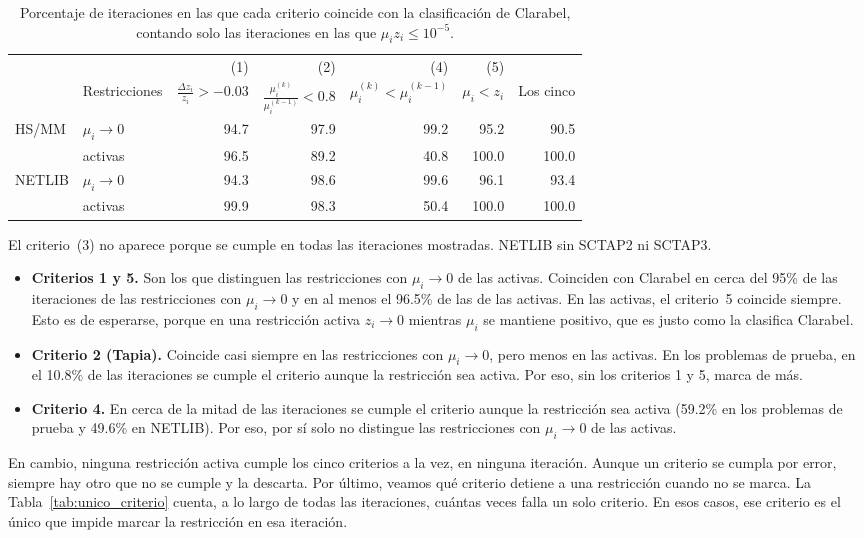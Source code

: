 \begin{table}[H]
\centering
\caption{Porcentaje de iteraciones en las que cada criterio coincide con la clasificación de Clarabel, contando solo las iteraciones en las que $\mu_i z_i \le 10^{-5}$.}
\label{tab:si_por_criterio}
\small
\begin{tabular}{l l r r r r r}
\toprule
 & & (1) & (2) & (4) & (5) & \\
 & Restricciones & $\frac{\Delta z_i}{z_i} > -0.03$ & $\frac{\mu_i^{(k)}}{\mu_i^{(k-1)}} < 0.8$ & $\mu_i^{(k)} < \mu_i^{(k-1)}$ & $\mu_i < z_i$ & Los cinco \\
\midrule
HS/MM  & $\mu_i \to 0$ & 94.7 & 97.9 & 99.2 & 95.2 & 90.5 \\
       & activas       & 96.5 & 89.2 & 40.8 & 100.0 & 100.0 \\
\midrule
NETLIB & $\mu_i \to 0$ & 94.3 & 98.6 & 99.6 & 96.1 & 93.4 \\
       & activas       & 99.9 & 98.3 & 50.4 & 100.0 & 100.0 \\
\bottomrule
\end{tabular}

\vspace{0.3em}
\footnotesize
El criterio~(3) no aparece porque se cumple en todas las iteraciones mostradas. NETLIB sin SCTAP2 ni SCTAP3.
\end{table}

\begin{itemize}
    \item \textbf{Criterios 1 y 5.} Son los que distinguen las restricciones con $\mu_i \to 0$ de las activas. Coinciden con Clarabel en cerca del 95\% de las iteraciones de las restricciones con $\mu_i \to 0$ y en al menos el 96.5\% de las de las activas. En las activas, el criterio~5 coincide siempre. Esto es de esperarse, porque en una restricción activa $z_i \to 0$ mientras $\mu_i$ se mantiene positivo, que es justo como la clasifica Clarabel.
    \item \textbf{Criterio 2 (Tapia).} Coincide casi siempre en las restricciones con $\mu_i \to 0$, pero menos en las activas. En los problemas de prueba, en el 10.8\% de las iteraciones se cumple el criterio aunque la restricción sea activa. Por eso, sin los criterios 1 y 5, marca de más.
    \item \textbf{Criterio 4.} En cerca de la mitad de las iteraciones se cumple el criterio aunque la restricción sea activa (59.2\% en los problemas de prueba y 49.6\% en NETLIB). Por eso, por sí solo no distingue las restricciones con $\mu_i \to 0$ de las activas.
\end{itemize}
En cambio, ninguna restricción activa cumple los cinco criterios a la vez, en ninguna iteración. Aunque un criterio se cumpla por error, siempre hay otro que no se cumple y la descarta.
Por último, veamos qué criterio detiene a una restricción cuando no se marca. La Tabla~\ref{tab:unico_criterio} cuenta, a lo largo de todas las iteraciones, cuántas veces falla un solo criterio. En esos casos, ese criterio es el único que impide marcar la restricción en esa iteración.

